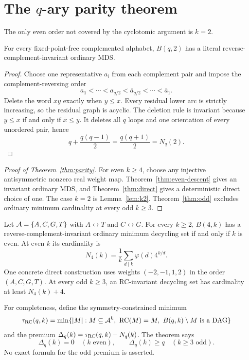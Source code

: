 \section{The \texorpdfstring{$q$}{q}-ary parity theorem}
\label{sec:parity-proof}

The only even order not covered by the cyclotomic argument is $k=2$.

\begin{lemma}
\label{lem:k2}
For every fixed-point-free complemented alphabet, $B(q,2)$ has a literal
reverse-complement-invariant ordinary MDS.
\end{lemma}

\begin{proof}
Choose one representative $a_i$ from each complement pair and impose the
complement-reversing order
\[
  a_1<\cdots<a_{q/2}<\bar a_{q/2}<\cdots<\bar a_1.
\]
Delete the word $xy$ exactly when $y\leq x$.  Every residual lower arc is
strictly increasing, so the residual graph is acyclic.  The deletion rule is
invariant because $y\leq x$ if and only if
$\bar x\leq\bar y$.  It deletes all $q$ loops and one orientation of every
unordered pair, hence
\[
  q+\frac{q(q-1)}2=\frac{q(q+1)}2=N_q(2).
\]
\end{proof}

\begin{proof}[Proof of Theorem~\ref{thm:parity}]
For even $k\geq4$, choose any injective antisymmetric nonzero real weight map.
Theorem~\ref{thm:even-descent} gives an invariant ordinary MDS, and
Theorem~\ref{thm:direct} gives a deterministic direct choice of one.  The
case $k=2$ is Lemma~\ref{lem:k2}.  Theorem~\ref{thm:odd} excludes ordinary
minimum cardinality at every odd $k\geq3$.
\end{proof}

\begin{corollary}[DNA]
\label{cor:dna}
Let $\mathcal A=\{A,C,G,T\}$ with $A\leftrightarrow T$ and
$C\leftrightarrow G$.  For every $k\geq2$, $B(4,k)$ has a
reverse-complement-invariant ordinary minimum decycling set if and only if
$k$ is even.  At even $k$ its cardinality is
\[
  N_4(k)=\frac1k\sum_{d\mid k}\varphi(d)4^{k/d}.
\]
One concrete direct construction uses weights $(-2,-1,1,2)$ in the order
$(A,C,G,T)$. At every odd $k\geq3$, an RC-invariant decycling set has
cardinality at least $N_4(k)+4$.
\end{corollary}

For completeness, define the symmetry-constrained minimum
\[
  \tau_{\operatorname{RC}}(q,k)=
  \min\{|M|:M\subseteq\mathcal A^k,\ \operatorname{RC}(M)=M,\ B(q,k)\setminus M\text{ is a DAG}\}
\]
and the premium $\Delta_q(k)=\tau_{\operatorname{RC}}(q,k)-N_q(k)$.  The theorem says
\[
  \Delta_q(k)=0\quad(k\text{ even}),
  \qquad
  \Delta_q(k)\geq q\quad(k\geq3\text{ odd}).
\]
No exact formula for the odd premium is asserted.
